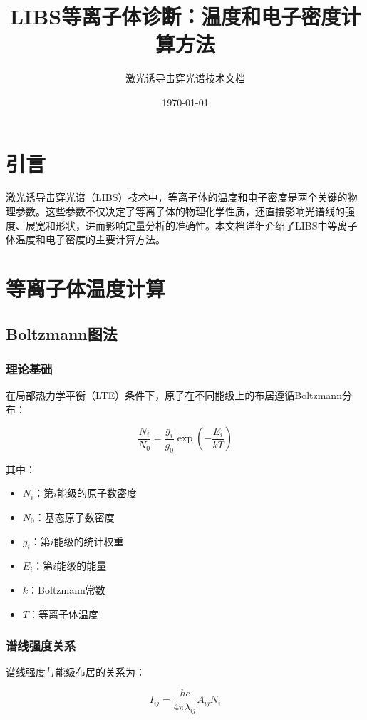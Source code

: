 \documentclass[12pt,a4paper]{article}
\title{\textbf{LIBS等离子体诊断：温度和电子密度计算方法}}
\author{激光诱导击穿光谱技术文档}
\date{\today}
\begin{document}
\maketitle
\section{引言}

激光诱导击穿光谱（LIBS）技术中，等离子体的温度和电子密度是两个关键的物理参数。这些参数不仅决定了等离子体的物理化学性质，还直接影响光谱线的强度、展宽和形状，进而影响定量分析的准确性。本文档详细介绍了LIBS中等离子体温度和电子密度的主要计算方法。

\section{等离子体温度计算}

\subsection{Boltzmann图法}

\subsubsection{理论基础}

在局部热力学平衡（LTE）条件下，原子在不同能级上的布居遵循Boltzmann分布：

\begin{equation}
\frac{N_i}{N_0} = \frac{g_i}{g_0} \exp\left(-\frac{E_i}{kT}\right)
\end{equation}

其中：
\begin{itemize}
    \item $N_i$：第$i$能级的原子数密度
    \item $N_0$：基态原子数密度
    \item $g_i$：第$i$能级的统计权重
    \item $E_i$：第$i$能级的能量
    \item $k$：Boltzmann常数
    \item $T$：等离子体温度
\end{itemize}

\subsubsection{谱线强度关系}

谱线强度与能级布居的关系为：

\begin{equation}
I_{ij} = \frac{hc}{4\pi\lambda_{ij}} A_{ij} N_i
\end{equation}
\end{document}
